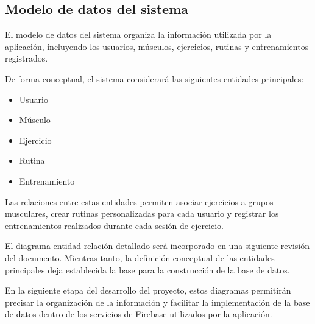 \subsection{Modelo de datos del sistema}

El modelo de datos del sistema organiza la información utilizada por la aplicación, incluyendo los usuarios, músculos, ejercicios, rutinas y entrenamientos registrados.

De forma conceptual, el sistema considerará las siguientes entidades principales:

\begin{itemize}
    \item Usuario
    \item Músculo
    \item Ejercicio
    \item Rutina
    \item Entrenamiento
\end{itemize}

Las relaciones entre estas entidades permiten asociar ejercicios a grupos musculares, crear rutinas personalizadas para cada usuario y registrar los entrenamientos realizados durante cada sesión de ejercicio.

El diagrama entidad-relación detallado será incorporado en una siguiente revisión del documento. Mientras tanto, la definición conceptual de las entidades principales deja establecida la base para la construcción de la base de datos.

En la siguiente etapa del desarrollo del proyecto, estos diagramas permitirán precisar la organización de la información y facilitar la implementación de la base de datos dentro de los servicios de Firebase utilizados por la aplicación.
